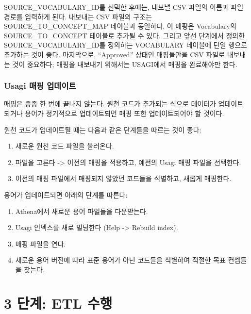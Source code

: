 \documentclass[11pt]{book}
\providecommand{\tightlist}{%
  \setlength{\itemsep}{0pt}\setlength{\parskip}{0pt}}
\theoremstyle{definition}
\theoremstyle{definition}
\theoremstyle{definition}
\theoremstyle{remark}
\begin{document}
SOURCE\_VOCABULARY\_ID를 선택한 후에는, 내보낼 CSV 파일의 이름과 파일
경로를 입력하게 된다. 내보내는 CSV 파일의 구조는
SOURCE\_TO\_CONCEPT\_MAP 테이블과 동일하다. 이 매핑은 Vocabulary의
SOURCE\_TO\_CONCEPT 테이블로 추가될 수 있다. 그리고 앞선 단계에서 정의한
SOURCE\_VOCABULARY\_ID를 정의하는 VOCABULARY 테이블에 단일 행으로
추가하는 것이 좋다. 마지막으로, ``Approved'' 상태인 매핑들만을 CSV
파일로 내보내는 것이 중요하다; 매핑을 내보내기 위해서는 USAGI에서 매핑을
완료해야만 한다.

\subsubsection*{Usagi 매핑 업데이트}\label{usagi--}

매핑은 종종 한 번에 끝나지 않는다. 원천 코드가 추가되는 식으로 데이터가
업데이트되거나 용어가 정기적으로 업데이트되면 매핑 또한 업데이트되어야
할 것이다.

원천 코드가 업데이트될 때는 다음과 같은 단계들을 따르는 것이 좋다:

\begin{enumerate}
\def\labelenumi{\arabic{enumi}.}
\tightlist
\item
  새로운 원천 코드 파일을 불러온다.
\item
  파일을 고른다 -\textgreater{} 이전의 매핑을 적용하고, 예전의 Usagi
  매핑 파일을 선택한다.
\item
  이전의 매핑 파일에서 매핑되지 않았던 코드들을 식별하고, 새롭게
  매핑한다.
\end{enumerate}

용어가 업데이트되면 아래의 단계를 따른다:

\begin{enumerate}
\def\labelenumi{\arabic{enumi}.}
\tightlist
\item
  Athena에서 새로운 용어 파일들을 다운받는다.
\item
  Usagi 인덱스를 새로 빌딩한다 (Help -\textgreater{} Rebuild index).
\item
  매핑 파일을 연다.
\item
  새로운 용어 버전에 따라 표준 용어가 아닌 코드들을 식별하여 적절한 목표
  컨셉들을 찾는다.
\end{enumerate}

\section{3 단계: ETL 수행}\label{-etl-}
\end{document}
